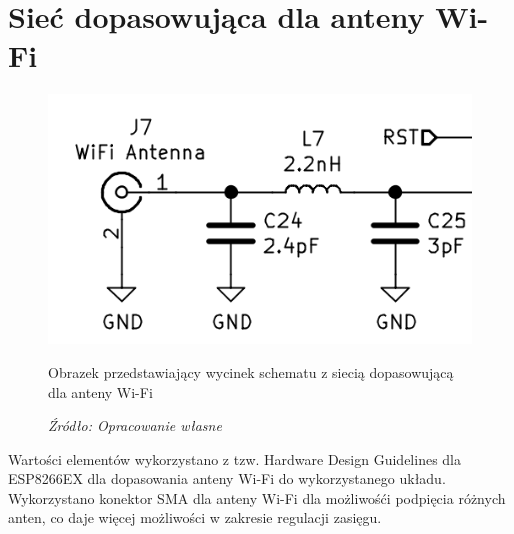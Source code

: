 \documentclass[12pt,a4paper,oneside]{memoir}
\begin{document}
\section{Sieć dopasowująca dla anteny Wi-Fi}
\begin{figure}[!h]
	\centering
	\includegraphics[scale=0.3]{images/sch/sch-12.png}
	{\tytulyrozdzialow \footnotesize \caption[Schemat - sieć dopasowania dla anteny] {Obrazek przedstawiający wycinek schematu z siecią dopasowującą dla anteny Wi-Fi}}
	\caption*{\textit{Źródło: Opracowanie własne}}
\end{figure}
\par Wartości elementów wykorzystano z tzw. Hardware Design Guidelines dla ESP8266EX \cite{esp8266exhdg} dla dopasowania anteny Wi-Fi do wykorzystanego układu. Wykorzystano konektor SMA dla anteny Wi-Fi dla możliwośći podpięcia różnych anten, co daje więcej możliwości w zakresie regulacji zasięgu.
\end{document}

